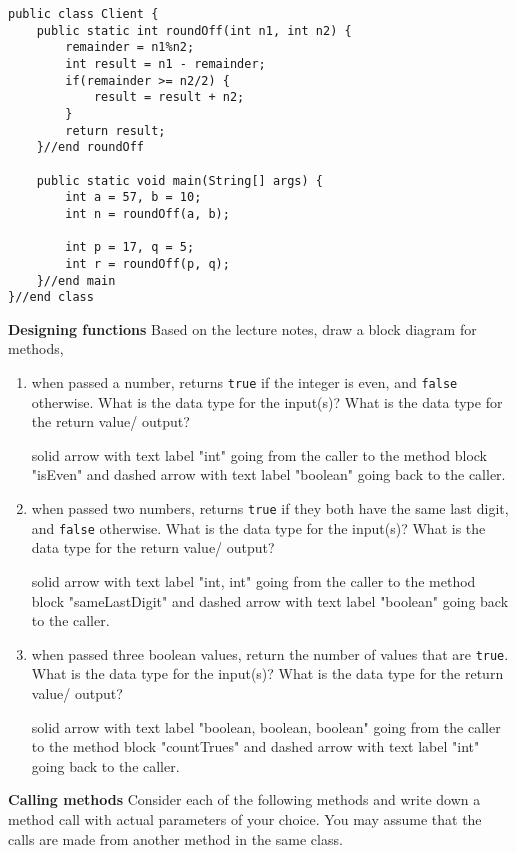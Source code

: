 \begin{questions}
\begin{parts}
\ifprintanswers
\begin{lstlisting}
public class Client {
	public static int roundOff(int n1, int n2) {
		remainder = n1%n2;
		int result = n1 - remainder;
		if(remainder >= n2/2) {
			result = result + n2;
		}
		return result;
	}//end roundOff

	public static void main(String[] args) {
		int a = 57, b = 10;
		int n = roundOff(a, b);
		
		int p = 17, q = 5;
		int r = roundOff(p, q);
	}//end main
}//end class
\end{lstlisting}
\else
\fi
\end{parts}

\question \textbf{Designing functions}
Based on the lecture notes, draw a block diagram for methods,

\begin{enumerate}
\item when passed a number, returns \texttt{true} if the integer is even, and \texttt{false} otherwise. What is the data type for the input(s)? What is the data type for the return value/ output?

\ifprintanswers
solid arrow with text label "int" going from the caller to the method block "isEven" and dashed arrow with text label "boolean" going back to the caller.
\else
\fi

\item when passed two numbers, returns \texttt{true} if they both have the same last digit, and \texttt{false} otherwise.  What is the data type for the input(s)? What is the data type for the return value/ output?

\ifprintanswers
solid arrow with text label "int, int" going from the caller to the method block "sameLastDigit" and dashed arrow with text label "boolean" going back to the caller.
\else
\fi

\item when passed three boolean values, return the number of values that are \texttt{true}.  What is the data type for the input(s)? What is the data type for the return value/ output?

\ifprintanswers
solid arrow with text label "boolean, boolean, boolean" going from the caller to the method block "countTrues" and dashed arrow with text label "int" going back to the caller.
\else
\fi

\end{enumerate}

\question \textbf{Calling methods}
Consider each of the following methods and write down a method call with actual parameters of your choice. You may assume that the calls are made from another method in the same class.


\end{questions}
